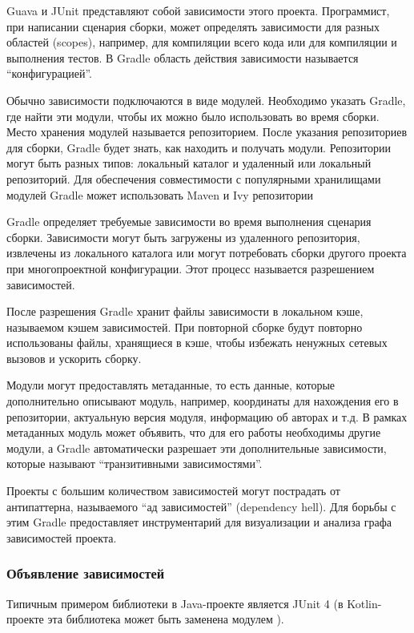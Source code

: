 Guava и JUnit представляют собой зависимости этого проекта.
Программист, при написании сценария сборки, может определять зависимости для разных областей (scopes), например, для компиляции всего кода или для компиляции и выполнения тестов.
В Gradle область действия зависимости называется ``конфигурацией''.

Обычно зависимости подключаются в виде модулей.
Необходимо указать Gradle, где найти эти модули, чтобы их можно было использовать во время сборки.
Место хранения модулей называется репозиторием.
После указания репозиториев для сборки, Gradle будет знать, как находить и получать модули.
Репозитории могут быть разных типов: локальный каталог и удаленный или локальный репозиторий.
Для обеспечения совместимости с популярными хранилищами модулей Gradle может использовать Maven и Ivy репозитории

Gradle определяет требуемые зависимости во время выполнения сценария сборки.
Зависимости могут быть загружены из удаленного репозитория, извлечены из локального каталога или могут потребовать сборки другого проекта при многопроектной конфигурации.
Этот процесс называется разрешением зависимостей.

После разрешения Gradle хранит файлы зависимости в локальном кэше, называемом кэшем зависимостей.
При повторной сборке будут повторно использованы файлы, хранящиеся в кэше, чтобы избежать ненужных сетевых вызовов и ускорить сборку.

Модули могут предоставлять метаданные, то есть данные, которые дополнительно описывают модуль, например, координаты для нахождения его в репозитории, актуальную версия модуля, информацию об авторах и т.д.
В рамках метаданных модуль может объявить, что для его работы необходимы другие модули, а Gradle автоматически разрешает эти дополнительные зависимости, которые называют ``транзитивными зависимостями''.

Проекты с большим количеством зависимостей могут пострадать от антипаттерна, называемого ``ад зависимостей'' (dependency hell).
Для борьбы с этим Gradle предоставляет инструментарий для визуализации и анализа графа зависимостей проекта.

\subsubsection*{Объявление зависимостей}

Типичным примером библиотеки в Java-проекте является JUnit 4 (в Kotlin-проекте эта библиотека может быть заменена модулем ).

